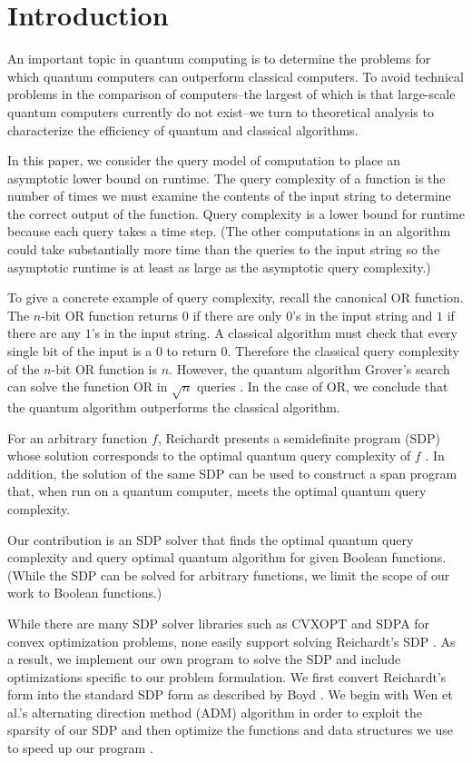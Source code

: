 \section{Introduction}

An important topic in quantum computing is
to determine the problems for which quantum
computers can outperform classical computers.
To avoid technical problems in the comparison of 
computers--the largest
of which is that large-scale quantum computers
currently do not exist--we turn to theoretical
analysis to characterize the efficiency of 
quantum and classical algorithms.

In this paper, we consider the query model of computation
to place an asymptotic lower bound on runtime.
The query complexity of a function 
is the number of times we must examine the
contents of the input string to determine the correct
output of the function. 
Query complexity is a lower bound for runtime
because each query takes a time step.
(The other computations in an algorithm could take substantially
more time than the queries to the input string
so the asymptotic runtime is at least as large 
as the asymptotic query complexity.)

To give a concrete example of query complexity,
recall the canonical OR function.
The $n$-bit OR
function returns $0$ if there are only $0$'s in the input
string and $1$ if there are any $1$'s in the input string.
A classical algorithm must check that
every single bit of the input is a $0$ to return $0$.
Therefore the classical query complexity of the $n$-bit OR
function is $n$. 
However, the quantum algorithm Grover's
search can solve the function OR in $\sqrt{n}$ queries
\cite{grover1996fast}. In the case of OR, we conclude that
the quantum algorithm outperforms the classical algorithm.

For an arbitrary function $f$,
Reichardt presents a semidefinite program (SDP)
whose solution corresponds to the optimal quantum query complexity
of $f$ \cite{reichardt2009span}.
In addition, the solution of the same SDP can
be used to construct a span program that, when run
on a quantum computer, meets the optimal quantum query complexity.

Our contribution is an SDP solver
that finds the optimal quantum query complexity
and query optimal quantum algorithm for given Boolean functions.
(While the SDP can be solved for arbitrary functions,
we limit the scope of our work to Boolean functions.)

While there are many SDP solver libraries such as CVXOPT and
SDPA for convex optimization problems,
none easily support solving Reichardt's SDP
\cite{cvxopt, SDPA}.
As a result, we implement our own program to solve the SDP
and include optimizations specific to our problem formulation.
We first convert Reichardt's form into the standard SDP form
as described by Boyd \cite{boyd2004convex}.
We begin with Wen et al.'s alternating direction method (ADM)
algorithm in order to exploit the sparsity of our SDP
and then optimize the functions and data structures we use
to speed up our program \cite{adm}.

